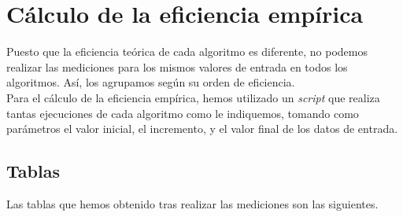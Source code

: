 \documentclass[11pt]{article}
\begin{document}
\section*{Cálculo de la eficiencia empírica}

Puesto que la eficiencia teórica de cada algoritmo es diferente, no podemos realizar las mediciones para los mismos valores de entrada en todos los algoritmos. Así, los agrupamos según su orden de eficiencia.\\

Para el cálculo de la eficiencia empírica, hemos utilizado un \textit{script} que realiza tantas ejecuciones de cada algoritmo como le indiquemos, tomando como parámetros el valor inicial, el incremento, y el valor final de los datos de entrada.

\subsection*{Tablas}

Las tablas que hemos obtenido tras realizar las mediciones son las siguientes.\\
\vspace{2em}

\burbujalinuxOCero
{}\seleccionlinuxOCero
{}\insercionlinuxOCero

 {\burbujalinuxOCero}
 {\burbujalinuxOCero}
 {\burbujalinuxOCero}

\mergesortlinuxOCero
{}\quicksortlinuxOCero
{}\heapsortlinuxOCero

 {\mergesortlinuxOCero}
 {\mergesortlinuxOCero}
 {\mergesortlinuxOCero}
\end{document}
